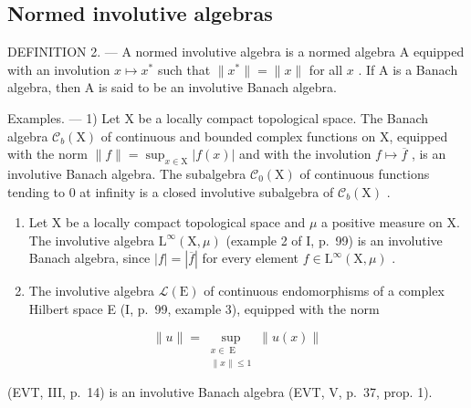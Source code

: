 \subsection{Normed involutive algebras}

DEFINITION 2. --- A normed involutive algebra is a normed algebra A equipped with an involution \(x \mapsto x^{*}\) such that \(\|x^{*}\| = \|x\|\) for all \(x\) . If A is a Banach algebra, then A is said to be an involutive Banach algebra.

Examples. --- 1) Let X be a locally compact topological space. The Banach algebra \(\mathcal{C}_{b}(\mathrm{X})\) of continuous and bounded complex functions on X, equipped with the norm \(\|f\| = \sup_{x\in\mathrm{X}}|f(x)|\) and with the involution \(f\mapsto\overline{f}\) , is an involutive Banach algebra. The subalgebra \(\mathcal{C}_{0}(\mathrm{X})\) of continuous functions tending to 0 at infinity is a closed involutive subalgebra of \(\mathcal{C}_{b}(\mathrm{X})\) .

\begin{enumerate}
\def\labelenumi{\arabic{enumi})}
\setcounter{enumi}{1}
\item
  Let X be a locally compact topological space and \(\mu\) a positive measure on X. The involutive algebra \(\mathrm{L}^{\infty}(\mathrm{X},\mu)\) (example 2 of I, p.~99) is an involutive Banach algebra, since \(|f| = |\overline{f}|\) for every element \(f \in \mathrm{L}^{\infty}(\mathrm{X},\mu)\) .
\item
  The involutive algebra \(\mathcal{L}(\mathrm{E})\) of continuous endomorphisms of a complex Hilbert space E (I, p.~99, example 3), equipped with the norm
\end{enumerate}

\[
\| u\| = \sup_{\substack{x\in \operatorname{E}\\ \| x\| \leqslant 1}}\| u(x)\|
\]

(EVT, III, p.~14) is an involutive Banach algebra (EVT, V, p.~37, prop. 1).

